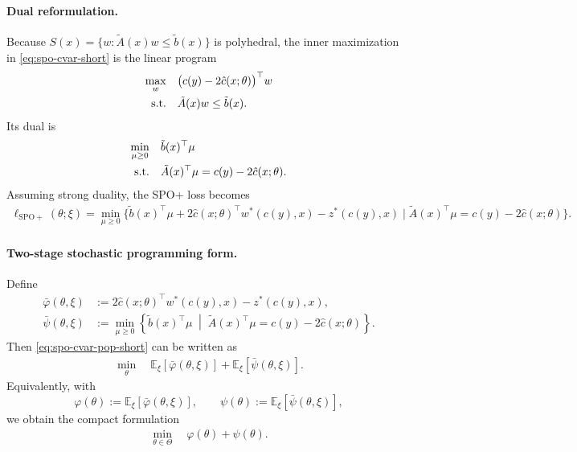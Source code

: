 \documentclass[11pt]{article}
\theoremstyle{definition}
\begin{document}
\paragraph{Dual reformulation.}
Because $S(x)=\{w:\tilde A(x)w\le \tilde b(x)\}$ is polyhedral, the inner
maximization in \eqref{eq:spo-cvar-short} is the linear program
\begin{align}
\max_w\quad
& \big(c(y)-2\hat c(x;\theta)\big)^\top w
\notag\\
\text{s.t.}\quad
& \tilde A(x)w\le \tilde b(x).
\label{eq:spo-inner-primal-short}
\end{align}
Its dual is
\begin{align}
\min_{\mu\ge 0}\quad
& \tilde b(x)^\top \mu
\notag\\
\text{s.t.}\quad
& \tilde A(x)^\top \mu = c(y)-2\hat c(x;\theta).
\label{eq:spo-inner-dual-short}
\end{align}
Assuming strong duality, the SPO+ loss becomes
\begin{align}
\ell_{\mathrm{SPO+}}(\theta;\xi)
=
\min_{\mu\ge 0}
\Bigg\{
\tilde b(x)^\top \mu
+2\hat c(x;\theta)^\top w^*(c(y),x)
-z^*(c(y),x)
\;\Big|\;
\tilde A(x)^\top \mu = c(y)-2\hat c(x;\theta)
\Bigg\}.
\label{eq:spo-dual-short}
\end{align}

\paragraph{Two-stage stochastic programming form.}
Define
\begin{align}
\bar\varphi(\theta,\xi)
&:=
2\hat c(x;\theta)^\top w^*(c(y),x)-z^*(c(y),x),
\label{eq:varphi-bar-short}
\\
\bar\psi(\theta,\xi)
&:=
\min_{\mu\ge 0}
\left\{
\tilde b(x)^\top \mu
\;\middle|\;
\tilde A(x)^\top \mu = c(y)-2\hat c(x;\theta)
\right\}.
\label{eq:psi-bar-short}
\end{align}
Then \eqref{eq:spo-cvar-pop-short} can be written as
\begin{align}
\min_{\theta}\quad
\mathbb E_{\xi}[\bar\varphi(\theta,\xi)]
+
\mathbb E_{\xi}[\bar\psi(\theta,\xi)].
\label{eq:two-stage-short-1}
\end{align}
Equivalently, with
\[
\varphi(\theta):=\mathbb E_{\xi}[\bar\varphi(\theta,\xi)],
\qquad
\psi(\theta):=\mathbb E_{\xi}[\bar\psi(\theta,\xi)],
\]
we obtain the compact formulation
\begin{align}
\min_{\theta\in\Theta}\quad \varphi(\theta)+\psi(\theta).
\label{eq:two-stage-short-compact}
\end{align}
\end{document}
